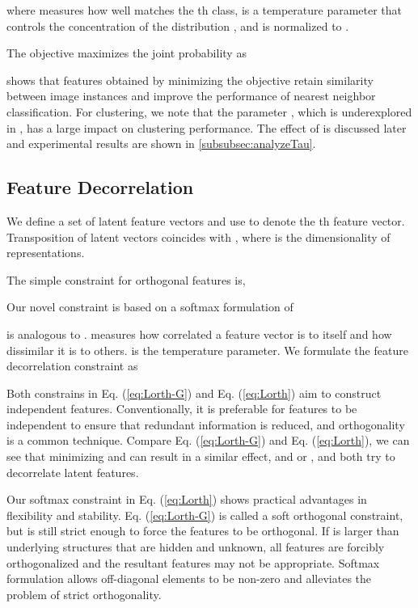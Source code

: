 \documentclass{article} \usepackage{iclr2021_conference,times}
\begin{document}
where  measures how well  matches the th class,  is a temperature parameter that controls the concentration of the distribution \cite{hinton2015distilling}, and  is normalized to .

The objective maximizes the joint probability  as

\cite{wu2018unsupervised} shows that features obtained by minimizing the objective retain similarity between image instances and improve the performance of nearest neighbor classification.
For clustering, we note that the parameter , which is underexplored in \cite{wu2018unsupervised}, has a large impact on clustering performance. The effect of  is discussed later and experimental results are shown in \ref{subsubsec:analyzeTau}.

\subsection{Feature Decorrelation}
\label{subsec:FD_FO}
We define a set of latent feature vectors  and use  to denote the th feature vector.
Transposition of latent vectors  coincides with , where  is the dimensionality of representations.

The simple constraint for orthogonal features is,
 

Our novel constraint is based on a softmax formulation of
 
 is analogous to .  measures how correlated a feature vector is to itself and how dissimilar it is to others.  is the temperature parameter.
We formulate the feature decorrelation constraint as
 
Both constrains in Eq. (\ref{eq:Lorth-G}) and Eq. (\ref{eq:Lorth}) aim to construct independent features. Conventionally, it is preferable for features to be independent to ensure that redundant information is reduced,
and orthogonality is a common technique.
Compare Eq. (\ref{eq:Lorth-G}) and Eq. (\ref{eq:Lorth}), we can see that minimizing  and  can result in a similar effect,  and  or , and both try to decorrelate latent features.

Our softmax constraint in Eq. (\ref{eq:Lorth}) shows practical advantages in flexibility and stability.
Eq. (\ref{eq:Lorth-G}) is called a soft orthogonal constraint, but is still strict enough to force the features to be orthogonal. If  is larger than underlying structures that are hidden and unknown, all features are forcibly orthogonalized and the resultant features may not be appropriate. Softmax formulation allows off-diagonal elements to be non-zero and alleviates the problem of strict orthogonality.
\end{document}
